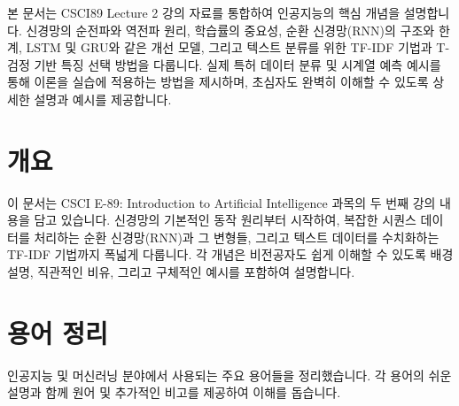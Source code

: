 \documentclass[11pt,a4paper]{article}
\begin{document}
\begin{summarybox}
본 문서는 CSCI89 Lecture 2 강의 자료를 통합하여 인공지능의 핵심 개념을 설명합니다.
신경망의 순전파와 역전파 원리, 학습률의 중요성, 순환 신경망(RNN)의 구조와 한계,
LSTM 및 GRU와 같은 개선 모델, 그리고 텍스트 분류를 위한 TF-IDF 기법과 T-검정 기반 특징 선택 방법을 다룹니다.
실제 특허 데이터 분류 및 시계열 예측 예시를 통해 이론을 실습에 적용하는 방법을 제시하며,
초심자도 완벽히 이해할 수 있도록 상세한 설명과 예시를 제공합니다.
\end{summarybox}

\newpage
\section{개요}
이 문서는 CSCI E-89: Introduction to Artificial Intelligence 과목의 두 번째 강의 내용을 담고 있습니다. 신경망의 기본적인 동작 원리부터 시작하여, 복잡한 시퀀스 데이터를 처리하는 순환 신경망(RNN)과 그 변형들, 그리고 텍스트 데이터를 수치화하는 TF-IDF 기법까지 폭넓게 다룹니다. 각 개념은 비전공자도 쉽게 이해할 수 있도록 배경 설명, 직관적인 비유, 그리고 구체적인 예시를 포함하여 설명합니다.

\newpage
\section{용어 정리}
인공지능 및 머신러닝 분야에서 사용되는 주요 용어들을 정리했습니다. 각 용어의 쉬운 설명과 함께 원어 및 추가적인 비고를 제공하여 이해를 돕습니다.
\end{document}
